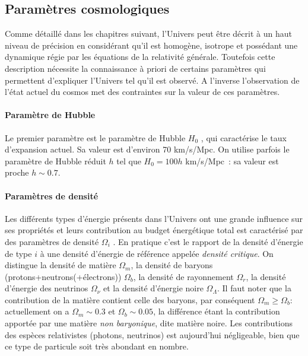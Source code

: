 \subsection{Paramètres cosmologiques}
Comme détaillé dans les chapitres suivant, l'Univers peut être décrit à un haut niveau de précision en considérant qu'il est homogène, isotrope et possédant une dynamique régie par les équations de la relativité générale. Toutefois cette description nécessite la connaissance à priori de certains paramètres qui permettent d'expliquer l'Univers tel qu'il est observé. A l'inverse l'observation de l'état actuel du cosmos met des contraintes sur la valeur de ces paramètres.

\paragraph{Paramètre de Hubble} Le premier paramètre est le paramètre de Hubble $H_0$ , qui caractérise le taux d'expansion actuel. Sa valeur est d'environ 70 km/s/Mpc. On utilise parfois le paramètre de Hubble réduit $h$ tel que $H_0=100 h$ km/s/Mpc~: sa valeur est proche $h\sim 0.7$.

\paragraph{Paramètres de densité} Les différents types d'énergie présents dans l'Univers ont une grande influence sur ses propriétés et leurs contribution au budget énergétique total est caractérisé par des paramètres de densité $\Omega_i$ . En pratique c'est le rapport de la densité d'énergie de type $i$ à une densité d'énergie de référence appelée \textit{densité critique}. On distingue la densité de matière $\Omega_m$, la densité de baryons (protons+neutrons(+électrons)) $\Omega_b$, la densité de rayonnement $\Omega_r$, la densité d'énergie des neutrinos $\Omega_\nu$ et la densité d'énergie noire $\Omega_\Lambda$. Il faut noter que la contribution de la matière contient celle des baryons, par conséquent $\Omega_m\ge\Omega_b$: actuellement on a $\Omega_m\sim 0.3$ et $\Omega_b\sim 0.05$, la différence étant la contribution apportée par une matière \textit{non baryonique}, dite matière noire. Les contributions des espèces relativistes (photons, neutrinos) est aujourd'hui négligeable, bien que ce type de particule soit très abondant en nombre.

